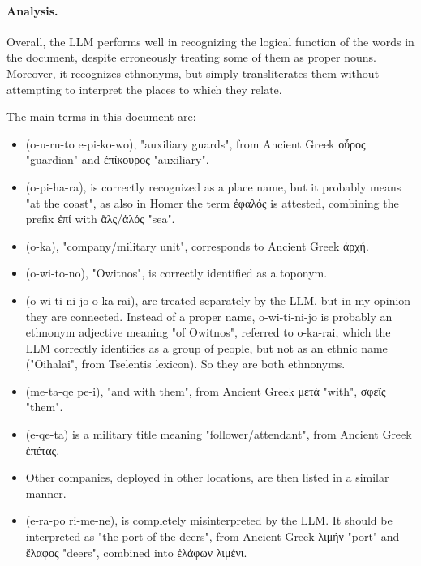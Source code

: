 \paragraph{Analysis.}
Overall, the LLM performs well in recognizing the logical function of the words in the document, despite erroneously treating some of them as proper nouns.
Moreover, it recognizes ethnonyms, but simply transliterates them without attempting to interpret the places to which they relate.

The main terms in this document are:
\begin{itemize}
  \item \textlinb{\Bo\Bu\Bru\Bto} \textlinb{\Be\Bpi\Bko\Bwo} (o-u-ru-to e-pi-ko-wo), "auxiliary guards", from Ancient Greek \textgreek{οὖρος} "guardian" and \textgreek{ἐπίκουρος} "auxiliary".
  \item {} (o-pi-ha-ra), is correctly recognized as a place name, but it probably means "at the coast", as also in Homer the term \textgreek{ἐφαλός} is attested, combining the prefix \textgreek{ἐπί} with \textgreek{ἅλς/ἁλός} "sea". 
  \item \textlinb{\Bo\Bka} (o-ka), "company/military unit", corresponds to Ancient Greek \textgreek{ἀρχή}.
  \item \textlinb{\Bo\Bwi\Bto\Bno} (o-wi-to-no), "Owitnos", is correctly identified as a toponym.
  \item \textlinb{\Bo\Bwi\Bto\Bni\Bjo} \textlinb{\Bo\Bwi\Bka\Braiii} (o-wi-ti-ni-jo o-ka-rai), are treated separately by the LLM, but in my opinion they are connected.
  Instead of a proper name, o-wi-ti-ni-jo is probably an ethnonym adjective meaning "of Owitnos", referred to o-ka-rai, which the LLM correctly identifies as a group of people, but not as an ethnic name ("Oihalai", from Tselentis lexicon).
  So they are both ethnonyms.
  \item \textlinb{\Bme\Bta\Bqe} \textlinb{\Bpe\Bi} (me-ta-qe pe-i), "and with them", from Ancient Greek \textgreek{μετά} "with", \textgreek{σφεῖς} "them".
  \item \textlinb{\Be\Bqe\Bta} (e-qe-ta) is a military title meaning "follower/attendant", from Ancient Greek \textgreek{ἑπέτας}.
  \item Other companies, deployed in other locations, are then listed in a similar manner.
  \item \textlinb{\Be\Bra\Bpo} \textlinb{\Bri\Bme\Bne} (e-ra-po ri-me-ne), is completely misinterpreted by the LLM.
  It should be interpreted as "the port of the deers", from Ancient Greek \textgreek{λιμήν} "port" and \textgreek{ἔλαφος} "deers", combined into \textgreek{ἐλάφων λιμένι}.
\end{itemize}

